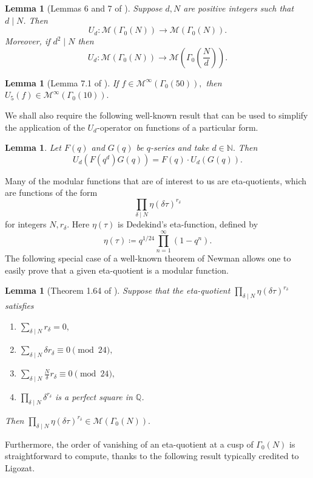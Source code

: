 \documentclass[12pt, reqno]{amsart}
\newtheorem{lem}[thm]{Lemma}
\theoremstyle{definition}
\theoremstyle{remark}
\newcommand{\NN}{\mathbb{N}}
\begin{document}
\begin{lem}[Lemmas 6 and 7 of \cite{AL}]\label{lem:Umap}
Suppose $d, N$ are positive integers such that $d \mid N$. Then 
\[U_d : \mathcal{M}(\Gamma_0(N)) \rightarrow \mathcal{M}(\Gamma_0(N)).\]
Moreover, if $d^2 \mid N$ then 
\[U_d : \mathcal{M}(\Gamma_0(N)) \rightarrow \mathcal{M}\left(\Gamma_0\left(\frac{N}{d}\right)\right).\]
\end{lem}

\begin{lem}[Lemma 7.1 of \cite{BS}]\label{lem:Umap2}
If $f \in \mathcal{M}^\infty(\Gamma_0(50)),$ then $U_5(f) \in \mathcal{M}^\infty(\Gamma_0(10)).$
\end{lem}

We shall also require the following well-known result that can be used to simplify the application of the $U_d$-operator on functions of a particular form. 

\begin{lem}\label{lem:U_PS}
Let $F(q)$ and $G(q)$ be $q$-series and take $d \in \NN.$ Then
\[U_d\left(F(q^d)G(q)\right) = F(q) \cdot U_d\left(G(q)\right).\]
\end{lem}

Many of the modular functions that are of interest to us are eta-quotients, which are functions of the form 
\[\prod\limits_{\delta \mid N} \eta(\delta \tau)^{r_\delta}\]
for integers $N, r_\delta.$ Here $\eta(\tau)$ is Dedekind's eta-function, defined by 
\[\eta(\tau) \coloneqq q^{1/24} \prod\limits_{n=1}^\infty (1-q^n).\]
The following special case of a well-known theorem of Newman allows one to easily prove that a given eta-quotient is a modular function. 

\begin{lem}[Theorem 1.64 of \cite{OnoWeb}]\label{lem:eta-quotient1}
Suppose that the eta-quotient $\prod\limits_{\delta \mid N} \eta(\delta \tau)^{r_\delta}$ satisfies
\begin{enumerate}
\item $\sum\limits_{\delta \mid N} r_{\delta} = 0,$
\item $\sum\limits_{\delta \mid N} \delta r_\delta \equiv 0 \pmod{24},$
\item $\sum\limits_{\delta \mid N} \frac{N}{\delta} r_\delta \equiv 0 \pmod{24},$
\item $\prod\limits_{\delta \mid N} \delta^{r_\delta}$  is a perfect square in $\mathbb{Q}$. 
\end{enumerate}
Then $\prod\limits_{\delta \mid N} \eta(\delta \tau)^{r_\delta} \in \mathcal{M}(\Gamma_0(N)).$ 
\end{lem}
Furthermore, the order of vanishing of an eta-quotient at a cusp of $\Gamma_0(N)$ is straightforward to compute, thanks to the following result typically credited to Ligozat. 
\end{document}
